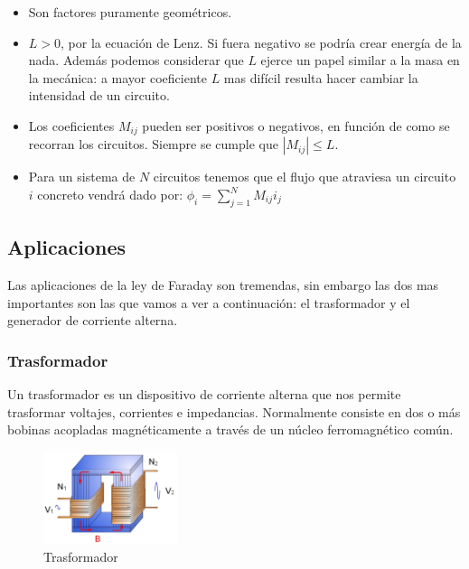 \documentclass[12pt,a4paper]{article}
\begin{document}
\begin{itemize}

\item Son factores puramente geométricos.

\item $L >0 $, por la ecuación de Lenz. Si fuera negativo se podría crear energía de la nada. Además podemos considerar que $L$ ejerce un papel similar a la masa en la mecánica: a mayor coeficiente $L$ mas difícil resulta hacer cambiar la intensidad de un circuito. 

\item Los coeficientes $M_{ij}$ pueden ser positivos o negativos, en función de como se recorran los circuitos. Siempre se cumple que $|M_{ij}| \leq L$. 

\item Para un sistema de $N$ circuitos tenemos que el flujo que atraviesa un circuito $i$ concreto vendrá dado por: $ \phi_i = \sum_{j=1}^N M_{ij} i_j $

\end{itemize}


\subsection{Aplicaciones}

Las aplicaciones de la ley de Faraday son tremendas, sin embargo las dos mas importantes son las que vamos a ver a continuación: el trasformador y el generador de corriente alterna.

\subsubsection{Trasformador}

Un trasformador es un dispositivo de corriente alterna que nos permite trasformar voltajes, corrientes e impedancias. Normalmente consiste en dos o más bobinas acopladas magnéticamente a través de un núcleo ferromagnético común.\\



\begin{figure}
    \centering
    \includegraphics[width=0.35\textwidth]{trasformador.jpg}
    \caption{Trasformador}
\end{figure}
\end{document}
